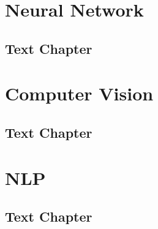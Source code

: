 \documentclass[11pt,fleqn]{book} %
\begin{document}


\part{Neural Network}



\chapter{Text Chapter}



\part{Computer Vision}



\chapter{Text Chapter}



\part{NLP}



\chapter{Text Chapter}
\end{document}
